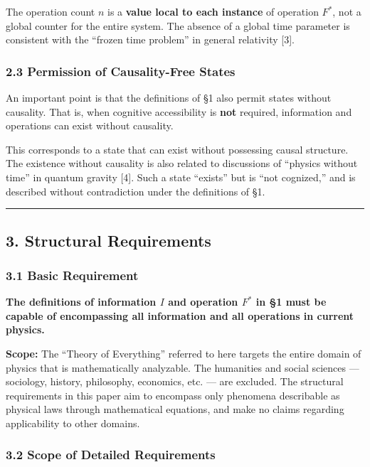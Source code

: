 \documentclass[a4paper,11pt]{article}
\begin{document}
The operation count \(n\) is a \textbf{value local to each instance} of
operation \(F^*\), not a global counter for the entire system. The
absence of a global time parameter is consistent with the ``frozen time
problem'' in general relativity {[}3{]}.

\subsubsection{2.3 Permission of Causality-Free
States}\label{permission-of-causality-free-states}

An important point is that the definitions of §1 also permit states
without causality. That is, when cognitive accessibility is \textbf{not}
required, information and operations can exist without causality.

This corresponds to a state that can exist without possessing causal
structure. The existence without causality is also related to
discussions of ``physics without time'' in quantum gravity {[}4{]}. Such
a state ``exists'' but is ``not cognized,'' and is described without
contradiction under the definitions of §1.

\begin{center}\rule{0.5\linewidth}{0.5pt}\end{center}

\subsection{3. Structural Requirements}\label{structural-requirements}

\subsubsection{3.1 Basic Requirement}\label{basic-requirement}

\textbf{The definitions of information \(I\) and operation \(F^*\) in §1
must be capable of encompassing all information and all operations in
current physics.}

\textbf{Scope:} The ``Theory of Everything'' referred to here targets
the entire domain of physics that is mathematically analyzable. The
humanities and social sciences --- sociology, history, philosophy,
economics, etc. --- are excluded. The structural requirements in this
paper aim to encompass only phenomena describable as physical laws
through mathematical equations, and make no claims regarding
applicability to other domains.

\subsubsection{3.2 Scope of Detailed
Requirements}\label{scope-of-detailed-requirements}
\end{document}
